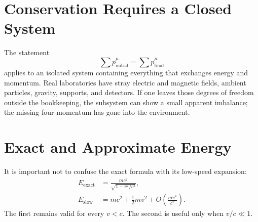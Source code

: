 \section{Conservation Requires a Closed System}

The statement
\begin{equation}
\sum p^\mu_{\mathrm{initial}}
=
\sum p^\mu_{\mathrm{final}}
\end{equation}
applies to an isolated system containing everything that exchanges energy and momentum. Real laboratories have stray electric and magnetic fields, ambient particles, gravity, supports, and detectors. If one leaves those degrees of freedom outside the bookkeeping, the subsystem can show a small apparent imbalance; the missing four-momentum has gone into the environment.

\begin{classroomqa}
\end{classroomqa}

\begin{classroomqa}
\end{classroomqa}

\section{Exact and Approximate Energy}

It is important not to confuse the exact formula with its low-speed expansion:
\begin{align}
E_{\mathrm{exact}}
&=
\frac{mc^2}{\sqrt{1-v^2/c^2}},
\label{eq:sr3-exact-repeated}\\
E_{\mathrm{slow}}
&=
mc^2+\frac12mv^2
+O\!\left(\frac{mv^4}{c^2}\right).
\label{eq:sr3-approx-repeated}
\end{align}
The first remains valid for every \(v<c\). The second is useful only when \(v/c\ll1\).

